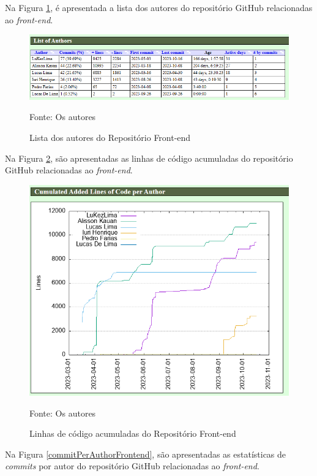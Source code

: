 \begin{apendicesenv}
Na Figura \ref{listOfAuthorsFrontend}, é apresentada a lista dos autores do repositório GitHub relacionadas ao \textit{front-end}.

\begin{figure}[H]
	\centering
	\includegraphics[scale=0.7]{./imagens/metricas/gitStatsFrontend/authors/listOfAuthors.png}
	\caption{Lista dos autores do Repositório Front-end}
	Fonte: Os autores
    \label{listOfAuthorsFrontend}
\end{figure}

Na Figura \ref{cumulatedLinesFrontend}, são apresentadas as linhas de código acumuladas do repositório GitHub relacionadas ao \textit{front-end}.

\begin{figure}[H]
	\centering
	\includegraphics[scale=0.7]{./imagens/metricas/gitStatsFrontend/authors/cumulatedLines.png}
	\caption{Linhas de código acumuladas do Repositório Front-end}
	Fonte: Os autores
    \label{cumulatedLinesFrontend}
\end{figure}
\pagebreak

Na Figura \ref{commitPerAuthorFrontend}, são apresentadas as estatísticas de \textit{commits} por autor do repositório GitHub relacionadas ao \textit{front-end}.


\end{apendicesenv}
